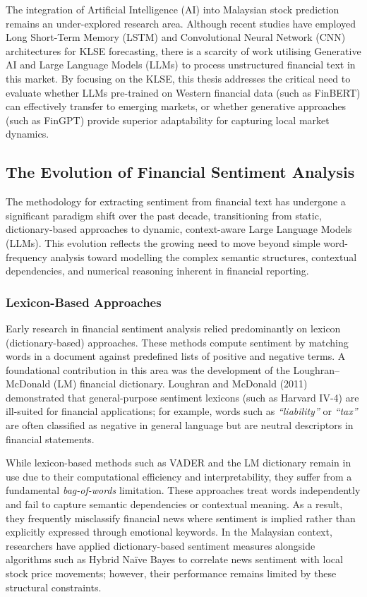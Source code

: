 \documentclass[singlespace]{ucetd}
\begin{document}
The integration of Artificial Intelligence (AI) into Malaysian stock prediction remains an under-explored research area. Although recent studies have employed Long Short-Term Memory (LSTM) and Convolutional Neural Network (CNN) architectures for KLSE forecasting, there is a scarcity of work utilising Generative AI and Large Language Models (LLMs) to process unstructured financial text in this market. By focusing on the KLSE, this thesis addresses the critical need to evaluate whether LLMs pre-trained on Western financial data (such as FinBERT) can effectively transfer to emerging markets, or whether generative approaches (such as FinGPT) provide superior adaptability for capturing local market dynamics.



\subsection{The Evolution of Financial Sentiment Analysis}

The methodology for extracting sentiment from financial text has undergone a significant paradigm shift over the past decade, transitioning from static, dictionary-based approaches to dynamic, context-aware Large Language Models (LLMs). This evolution reflects the growing need to move beyond simple word-frequency analysis toward modelling the complex semantic structures, contextual dependencies, and numerical reasoning inherent in financial reporting.

\subsubsection{Lexicon-Based Approaches}

Early research in financial sentiment analysis relied predominantly on lexicon (dictionary-based) approaches. These methods compute sentiment by matching words in a document against predefined lists of positive and negative terms. A foundational contribution in this area was the development of the Loughran--McDonald (LM) financial dictionary. Loughran and McDonald (2011) demonstrated that general-purpose sentiment lexicons (such as Harvard IV-4) are ill-suited for financial applications; for example, words such as \emph{``liability''} or \emph{``tax''} are often classified as negative in general language but are neutral descriptors in financial statements.

While lexicon-based methods such as VADER and the LM dictionary remain in use due to their computational efficiency and interpretability, they suffer from a fundamental \emph{bag-of-words} limitation. These approaches treat words independently and fail to capture semantic dependencies or contextual meaning. As a result, they frequently misclassify financial news where sentiment is implied rather than explicitly expressed through emotional keywords. In the Malaysian context, researchers have applied dictionary-based sentiment measures alongside algorithms such as Hybrid Na\"ive Bayes to correlate news sentiment with local stock price movements; however, their performance remains limited by these structural constraints.
\end{document}
